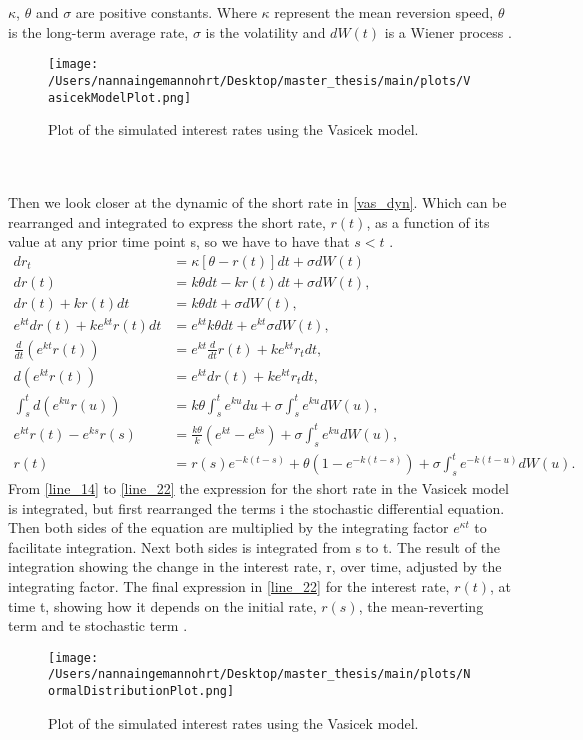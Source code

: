 $\kappa$, $\theta$ and $\sigma$ are positive constants. Where $\kappa$ represent the mean reversion speed, $\theta$ 
is the long-term average rate, $\sigma$ is the volatility  and $dW(t)$ is a Wiener process \cite{Bermudan}. 
\begin{figure}[h]
    \centering
    \texttt{[image: /Users/nannaingemannohrt/Desktop/master\_thesis/main/plots/VasicekModelPlot.png]}
    \caption{Plot of the simulated interest rates using the Vasicek model.}
    \label{fig:vasicek}
\end{figure}
\\\\
\noindent
Then we look closer at the dynamic of the short rate in \autoref{vas_dyn}. Which can be rearranged and integrated
to express the short rate, $r(t)$, as a function of its value at any prior time point s,
so we have to have that $s < t$ \cite{Bermudan}. 
\begin{align}
    d r_t &= \kappa \left[\theta - r(t)\right] dt + \sigma d W(t) \label{line_14} \\
    d r(t) &= k \theta dt - k r(t) dt + \sigma d W(t),  \\
    d r(t) + k r(t) dt &= k \theta dt + \sigma d W(t), \\
    e^{kt} d r(t) + k e^{kt} r(t) dt &= e^{kt} k \theta dt + e^{kt} \sigma d W(t), \\
    \frac{d}{dt} \left( e^{k t} r(t) \right) &= e^{k t} \frac{d}{dt} r(t) + k e^{k t} r_t dt, \\
    d\left( e^{k t} r(t) \right) &= e^{k t} dr(t) + k e^{k t} r_t dt, \\
    \int_s^t d \left( e^{ku} r(u) \right) &= k \theta \int_s^t e^{ku} du + \sigma \int_s^t e^{ku} d W(u), \\
    e^{kt} r(t) - e^{k s} r(s) &= \frac{k \theta}{k} \left( e^{kt} - e^{ks} \right) + \sigma \int_s^t e^{ku} d W(u), \\
    r(t) &= r(s) e^{-k(t-s)} + \theta \left( 1 - e^{-k(t-s)} \right) + \sigma \int_s^t e^{-k(t-u)} d W(u). \label{line_22}
\end{align}
From \autoref{line_14} to \autoref{line_22} the expression for the short rate in the Vasicek model is integrated, but first
rearranged the terms i the stochastic differential equation. Then both sides of the equation are multiplied by the 
integrating factor $e^{\kappa t}$ to facilitate integration. Next both sides is integrated from s to t. The result of the
integration showing the change in the interest rate, r, over time, adjusted by the integrating factor. The final 
expression in \autoref{line_22} for the interest rate, $r(t)$, at time t, showing how it depends on the initial rate, $r(s)$,
the mean-reverting term and te stochastic term \cite{Bermudan}. 

\begin{figure}[h]
    \centering
    \texttt{[image: /Users/nannaingemannohrt/Desktop/master\_thesis/main/plots/NormalDistributionPlot.png]}
    \caption{Plot of the simulated interest rates using the Vasicek model.}
    \label{fig:rates:hist}
\end{figure}